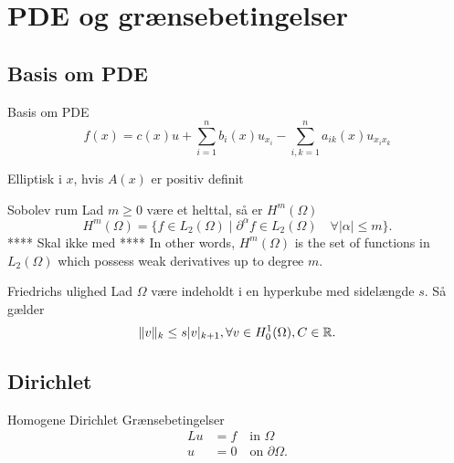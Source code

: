 
\section{PDE og grænsebetingelser}
\subsection{Basis om PDE}
\begin{frame}{Basis om PDE}{}
    \begin{equation*}
        f(x) = c(x) u + \sum_{i=1}^{n}b_i(x)u_{x_{i}}
       - \sum_{i,k=1}^{n}a_{ik}(x)u_{x_i x_k}
   \end{equation*}    

   Elliptisk i $x$, hvis $A(x)$ er positiv definit
\end{frame}

\begin{frame}{Sobolev rum}{}
    Lad $m \geq 0$ være et helttal, så er $H^m(\Omega)$
    \begin{equation*}
        H^m(\Omega) = \{  f \in L_2(\Omega) \mid \partial ^{\alpha}f \in 
        L_2(\Omega) \quad \forall |\alpha| \leq m  \}.
    \end{equation*}
    **** Skal ikke med ****
    In other words, $H^m(\Omega)$ is the set of functions in $L_2(\Omega)$ 
    which possess weak derivatives up to degree $m$.
\end{frame}

\begin{frame}{Friedrichs ulighed}{}
    Lad $\Omega$ være indeholdt i en hyperkube med sidelængde $s$. Så gælder
    \begin{equation*}
        \| v \|_{k} \leq s |v|_{k+1}, \forall v \in H_0^1(\Omega), C \in \mathbb{R}.
    \end{equation*}
\end{frame}

\subsection{Dirichlet}
\begin{frame}{Homogene Dirichlet Grænsebetingelser}{}
    \begin{align*}
        Lu &= f \quad \text{in } \Omega\\
        u &= 0 \quad \text{on } \partial \Omega.
    \end{align*}
\end{frame}

